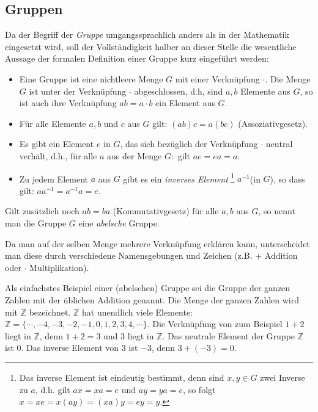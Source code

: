 \begin{refsegment}
\subsection{Gruppen}

Da der Begriff der {\em Gruppe} umgangssprachlich anders als in der Mathematik eingesetzt wird, soll der
Vollständigkeit halber an dieser Stelle die wesentliche Aussage der formalen Definition einer Gruppe
kurz eingeführt werden:
\begin{itemize}
   \item Eine Gruppe ist eine nichtleere Menge $G$ mit einer Verknüpfung \glqq $\cdot$\grqq. Die Menge $G$ ist unter der
         Verknüpfung $\cdot $ abgeschlossen, d.h, sind $a,b$ Elemente aus $G$, so ist auch ihre Verknüpfung $ab=a\cdot  b$ ein Element aus $G$.
   \item Für alle Elemente $a, b$ und $c$ aus $G$ gilt: $(ab)c = a(bc)$ (Assoziativgesetz).
   \item Es gibt ein Element $e$ in $G$, das sich bezüglich der Verknüpfung $\cdot$ neutral verhält, d.h., für alle $a$ aus der Menge $G:$ gilt $ae = ea = a$.
   \item Zu jedem Element $a$ aus $G$ gibt es ein {\it inverses Element}%
\footnote{Das inverse Element ist eindeutig bestimmt, denn sind $x,y\in G$ zwei Inverse zu $a$, d.h. gilt $ax=xa=e$ und $ay=ya=e$, so folgt $x=xe=x(ay)=(xa)y=ey=y$.}
$a^{-1}$(in $G$), so dass gilt: $aa^{-1} = a^{-1}a = e$.
\end{itemize}

Gilt zusätzlich noch $ab = ba$ (Kommutativgesetz) für alle $a, b$ aus $G$, so nennt
man die Gruppe $G$ eine {\em abelsche} Gruppe.

Da man auf der selben Menge mehrere Verknüpfung erklären kann, unterscheidet man
diese durch verschiedene Namensgebungen und Zeichen (z.B. $+$ Addition oder $\cdot$
Multiplikation).

Als einfachstes Beispiel einer (abelschen) Gruppe sei die Gruppe der ganzen Zahlen
mit der üblichen Addition genannt. Die Menge der ganzen Zahlen wird mit ${\mathbb Z}$
bezeichnet. ${\mathbb Z}$ hat unendlich viele Elemente:
${\mathbb Z} = \{ \cdots, -4, -3, -2, -1, 0, 1, 2, 3, 4, \cdots\}$.
Die Verknüpfung von zum Beispiel $1+2$ liegt in ${\mathbb Z}$, denn $1+2 = 3$ und $3$
liegt in ${\mathbb Z}$. Das neutrale Element der Gruppe ${\mathbb Z}$ ist $0$.
Das inverse Element von $3$ ist $-3$, denn $3+(-3) = 0$.


\end{refsegment}
